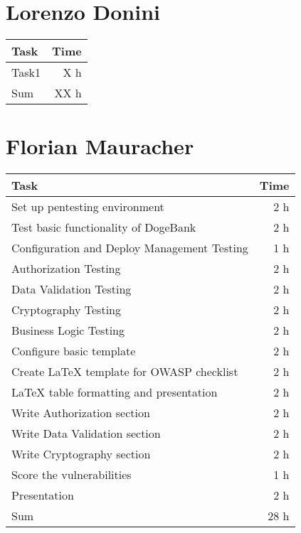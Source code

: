 \clearpage
\section*{Lorenzo Donini}
\begin{table}[h!tpb]
  \centering
  \begin{tabularx}{\textwidth}{X r}
    \toprule
      Task & Time \\
    \midrule
      Task1 & X h \\
    \midrule
      Sum & XX h \\
    \bottomrule
  \end{tabularx}
\end{table}

\clearpage
\section*{Florian Mauracher}
\begin{table}[h!tpb]
  \centering
  \begin{tabularx}{\textwidth}{X r}
    \toprule
      Task & Time \\
    \midrule
      Set up pentesting environment & 2 h \\
      Test basic functionality of DogeBank & 2 h \\
      Configuration and Deploy Management Testing & 1 h \\
      Authorization Testing & 2 h \\
      Data Validation Testing & 2 h \\
      Cryptography Testing & 2 h \\
      Business Logic Testing & 2 h \\
      Configure basic \LateX{} template & 2 h \\
      Create \LaTeX{} template for OWASP checklist & 2 h \\
      LaTeX table formatting and presentation & 2 h \\
      Write Authorization section & 2 h \\
      Write Data Validation section & 2 h \\
      Write Cryptography section & 2 h \\
      Score the vulnerabilities & 1 h \\
      Presentation & 2 h \\
    \midrule
      Sum & 28 h \\
    \bottomrule
  \end{tabularx}
\end{table}

